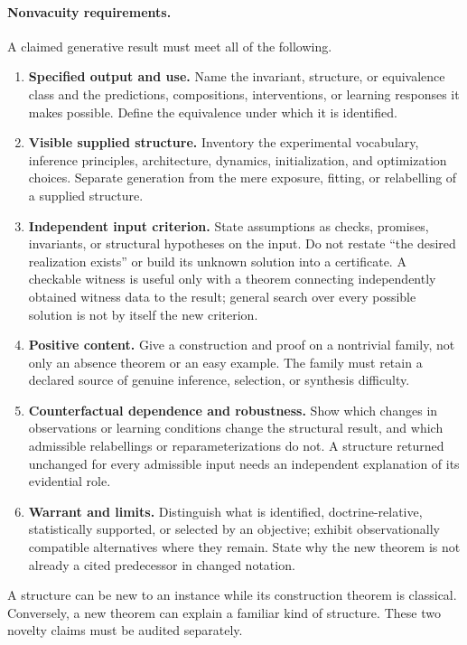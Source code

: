 \documentclass[11pt]{article}
\theoremstyle{remark}
\begin{document}
\paragraph{Nonvacuity requirements.}
A claimed generative result must meet all of the following.
\begin{enumerate}
\item \textbf{Specified output and use.} Name the invariant, structure, or equivalence class and the predictions, compositions, interventions, or learning responses it makes possible. Define the equivalence under which it is identified.
\item \textbf{Visible supplied structure.} Inventory the experimental vocabulary, inference principles, architecture, dynamics, initialization, and optimization choices. Separate generation from the mere exposure, fitting, or relabelling of a supplied structure.
\item \textbf{Independent input criterion.} State assumptions as checks, promises, invariants, or structural hypotheses on the input. Do not restate ``the desired realization exists'' or build its unknown solution into a certificate. A checkable witness is useful only with a theorem connecting independently obtained witness data to the result; general search over every possible solution is not by itself the new criterion.
\item \textbf{Positive content.} Give a construction and proof on a nontrivial family, not only an absence theorem or an easy example. The family must retain a declared source of genuine inference, selection, or synthesis difficulty.
\item \textbf{Counterfactual dependence and robustness.} Show which changes in observations or learning conditions change the structural result, and which admissible relabellings or reparameterizations do not. A structure returned unchanged for every admissible input needs an independent explanation of its evidential role.
\item \textbf{Warrant and limits.} Distinguish what is identified, doctrine-relative, statistically supported, or selected by an objective; exhibit observationally compatible alternatives where they remain. State why the new theorem is not already a cited predecessor in changed notation.
\end{enumerate}

A structure can be new to an instance while its construction theorem is classical. Conversely, a new theorem can explain a familiar kind of structure. These two novelty claims must be audited separately.
\end{document}
